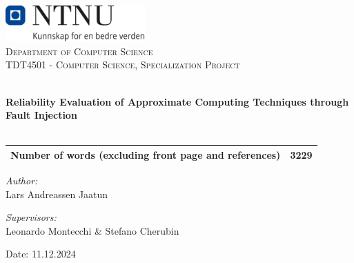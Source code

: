 
\begin{titlepage}
\vbox{ }
\vbox{ }
\begin{center}
\includegraphics[width=0.40\textwidth]{Images/NTNU_logo.png}\\[1cm]
\textsc{\LARGE Department of Computer Science}\\[1.5cm]
\textsc{\Large TDT4501 - Computer Science, Specialization Project }\\[0.5cm]
\vbox{ }

\HRule \\[0.4cm]
{ \huge \bfseries Reliability Evaluation of Approximate Computing Techniques through Fault Injection }\\[0.4cm]
\HRule \\[1.5cm]

\begin{center}
    \begin{tabular}{c|c}
    \hline
       Number of words (excluding front page and references) & 3229\\
       \hline
    \end{tabular}
\end{center}


\emph{\large Author:}\\
{\large Lars Andreassen Jaatun}

\emph{\large Supervisors:}\\
{\large Leonardo Montecchi \& Stefano Cherubin}
\vfill

{\large Date: 11.12.2024}
\end{center}
\end{titlepage}